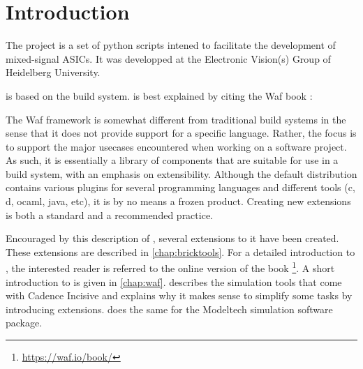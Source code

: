 \chapter{Introduction}
The  project is a set of python scripts intened to facilitate the
development of mixed-signal \Glspl{ASIC}. It was developped at the
Electronic Vision(s) Group of Heidelberg University.

 is based on the  build system.  is best explained by
citing the Waf book \cite{wafbook}:
\begin{displayquote}
	The Waf framework is somewhat different from traditional build systems in
	the sense that it does not provide support for a specific language. Rather,
	the focus is to support the major usecases encountered when working on a
	software project. As such, it is essentially a library of components that
	are suitable for use in a build system, with an emphasis on extensibility.
	Although the default distribution contains various plugins for several
	programming languages and different tools (c, d, ocaml, java, etc), it is
	by no means a frozen product. Creating new extensions is both a standard
	and a recommended practice.
\end{displayquote}

Encouraged by this description of , several extensions to it have been
created. These extensions are described in \cref{chap:bricktools}.
For a detailed introduction to , the interested reader is referred to
the online version of the  book
\cite{wafbook}\footnote{\url{https://waf.io/book/}}. A short introduction to
 is given in \cref{chap:waf}.
 describes the simulation tools that come with Cadence
Incisive and explains why it makes sense to simplify some tasks by introducing
 extensions.  does the same for the Modeltech
simulation software package.
